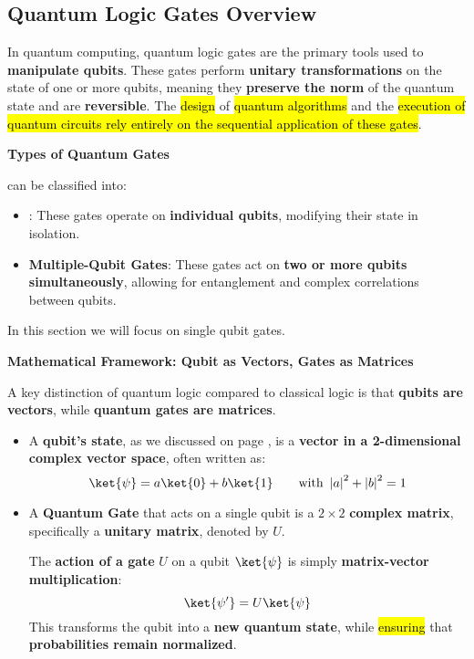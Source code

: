 \subsection{Quantum Logic Gates Overview}

In quantum computing, quantum logic gates are the primary tools used to \textbf{manipulate qubits}. These gates perform \textbf{unitary transformations} on the state of one or more qubits, meaning they \textbf{preserve the norm} of the quantum state and are \textbf{reversible}. The \hl{design} of \hl{quantum algorithms} and the \hl{execution of quantum circuits rely entirely on the sequential application of these gates}.

\highspace
\begin{flushleft}
    \textcolor{Green3}{ \textbf{Types of Quantum Gates}}
\end{flushleft}
 can be classified into:
\begin{itemize}
    \item {}: These gates operate on \textbf{individual qubits}, modifying their state in isolation.
    \item \textbf{Multiple-Qubit Gates}: These gates act on \textbf{two or more qubits simultaneously}, allowing for entanglement and complex correlations between qubits.
\end{itemize}
In this section we will focus on single qubit gates.

\highspace
\begin{flushleft}
    \textcolor{Green3}{ \textbf{Mathematical Framework: Qubit as Vectors, Gates as Matrices}}
\end{flushleft}
A key distinction of quantum logic compared to classical logic is that \textbf{qubits are vectors}, while \textbf{quantum gates are matrices}.
\begin{itemize}
    \item A \textbf{qubit's state}, as we discussed on page \pageref{subsection: Single Qubits}, is a \textbf{vector in a 2-dimensional complex vector space}, often written as:
    \begin{equation*}
        \ket{\psi} = a\ket{0} + b\ket{1} \hspace{2em} \text{with } \left|a\right|^{2} + \left|b\right|^{2} = 1
    \end{equation*}

    \item A \textbf{Quantum Gate} that acts on a single qubit is a $2 \times 2$ \textbf{complex matrix}, specifically a \textbf{unitary matrix}, denoted by $U$.

    The \textbf{action of a gate} $U$ on a qubit $\ket{\psi}$ is simply \textbf{matrix-vector multiplication}:
    \begin{equation}
        \ket{\psi'} = U\ket{\psi}
    \end{equation}
    This transforms the qubit into a \textbf{new quantum state}, while \hl{ensuring} that \textbf{probabilities remain normalized}.
\end{itemize}

